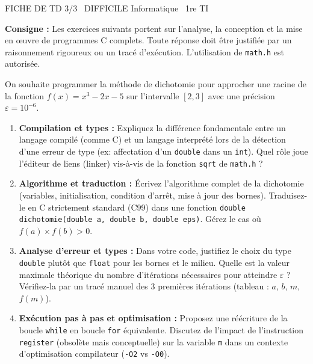 \documentclass[11pt]{article}
\begin{document}
\begin{tcolorbox}[enhanced,colback=popink,colframe=popink,arc=10pt,boxrule=0pt,left=12pt,right=12pt,top=9pt,bottom=9pt]
{\color{white}\popxbold\small FICHE DE TD 3/3 \textbullet\ DIFFICILE \hfill Informatique \textbullet\ 1re TI\par}
\end{tcolorbox}
\vspace{4pt}
\noindent \textbf{Consigne :} Les exercices suivants portent sur l'analyse, la conception et la mise en œuvre de programmes C complets. Toute réponse doit être justifiée par un raisonnement rigoureux ou un tracé d'exécution. L'utilisation de \texttt{math.h} est autorisée.

\begin{exercice}
On souhaite programmer la méthode de dichotomie pour approcher une racine de la fonction $f(x) = x^3 - 2x - 5$ sur l'intervalle $[2, 3]$ avec une précision $\varepsilon = 10^{-6}$.
\begin{enumerate}
    \item \textbf{Compilation et types :} Expliquez la différence fondamentale entre un langage compilé (comme C) et un langage interprété lors de la détection d'une erreur de type (ex: affectation d'un \texttt{double} dans un \texttt{int}). Quel rôle joue l'éditeur de liens (linker) vis-à-vis de la fonction \texttt{sqrt} de \texttt{math.h} ?
    \item \textbf{Algorithme et traduction :} Écrivez l'algorithme complet de la dichotomie (variables, initialisation, condition d'arrêt, mise à jour des bornes). Traduisez-le en C strictement standard (C99) dans une fonction \texttt{double dichotomie(double a, double b, double eps)}. Gérez le cas où $f(a) \times f(b) > 0$.
    \item \textbf{Analyse d'erreur et types :} Dans votre code, justifiez le choix du type \texttt{double} plutôt que \texttt{float} pour les bornes et le milieu. Quelle est la valeur maximale théorique du nombre d'itérations nécessaires pour atteindre $\varepsilon$ ? Vérifiez-la par un tracé manuel des 3 premières itérations (tableau : $a$, $b$, $m$, $f(m)$).
    \item \textbf{Exécution pas à pas et optimisation :} Proposez une réécriture de la boucle \texttt{while} en boucle \texttt{for} équivalente. Discutez de l'impact de l'instruction \texttt{register} (obsolète mais conceptuelle) sur la variable \texttt{m} dans un contexte d'optimisation compilateur (\texttt{-O2} vs \texttt{-O0}).
\end{enumerate}
\end{exercice}
\end{document}
